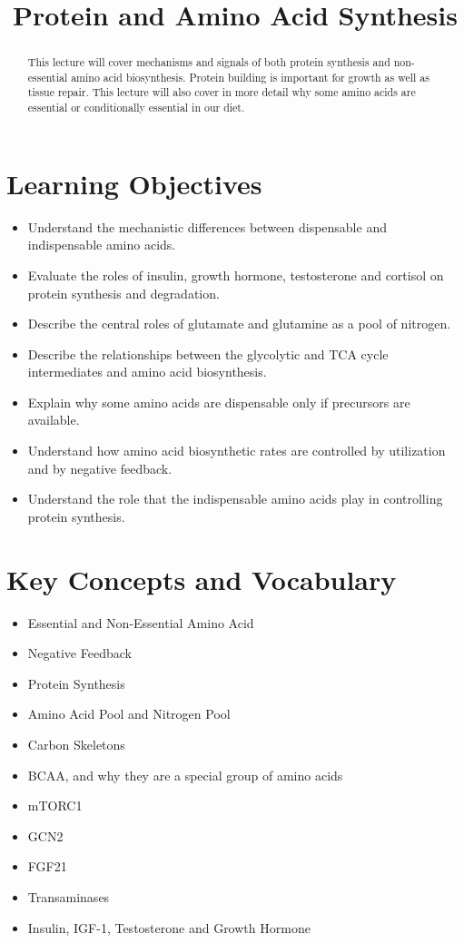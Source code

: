 \documentclass{tufte-handout}
\title{Protein and Amino Acid Synthesis}
\author{}
\date{}  %
\begin{document}
\maketitle%

\begin{abstract}
\noindent This lecture will cover mechanisms and signals of both protein synthesis and non-essential amino acid biosynthesis.  Protein building is important for growth as well as tissue repair.  This lecture will also cover in more detail why some amino acids are essential or conditionally essential in our diet.
\end{abstract}

\tableofcontents

\pagebreak
\section{Learning Objectives}

\begin{itemize}
\item Understand the mechanistic differences between dispensable and indispensable amino acids.
\item Evaluate the roles of insulin, growth hormone, testosterone and cortisol on protein synthesis and degradation.
\item Describe the central roles of glutamate and glutamine as a pool of nitrogen.
\item Describe the relationships between the glycolytic and TCA cycle intermediates and amino acid biosynthesis.
\item Explain why some amino acids are dispensable only if precursors are available.
\item Understand how amino acid biosynthetic rates are controlled by utilization and by negative feedback.
\item Understand the role that the indispensable amino acids play in controlling protein synthesis.
\end{itemize}

\section{Key Concepts and Vocabulary}
\begin{itemize}
	\item Essential and Non-Essential Amino Acid
	\item Negative Feedback
	\item Protein Synthesis
	\item Amino Acid Pool and Nitrogen Pool
	\item Carbon Skeletons
	\item BCAA, and why they are a special group of amino acids
	\item mTORC1 
	\item GCN2
	\item FGF21
	\item Transaminases
	\item Insulin, IGF-1, Testosterone and Growth Hormone
\end{itemize}
\end{document}
